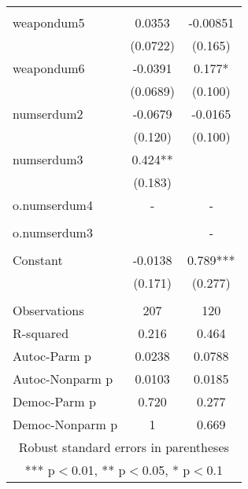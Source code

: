 \documentclass[]{article}
\begin{document}
\begin{tabular}{lcc}
 &  &  \\
weapondum5 & 0.0353 & -0.00851 \\
 & (0.0722) & (0.165) \\
weapondum6 & -0.0391 & 0.177* \\
 & (0.0689) & (0.100) \\
numserdum2 & -0.0679 & -0.0165 \\
 & (0.120) & (0.100) \\
numserdum3 & 0.424** &  \\
 & (0.183) &  \\
o.numserdum4 & - & - \\
 &  &  \\
o.numserdum3 &  & - \\
 &  &  \\
Constant & -0.0138 & 0.789*** \\
 & (0.171) & (0.277) \\
 &  &  \\
Observations & 207 & 120 \\
R-squared & 0.216 & 0.464 \\
Autoc-Parm p & 0.0238 & 0.0788 \\
Autoc-Nonparm p & 0.0103 & 0.0185 \\
Democ-Parm p & 0.720 & 0.277 \\
 Democ-Nonparm p & 1 & 0.669 \\ \hline
\multicolumn{3}{c}{ Robust standard errors in parentheses} \\
\multicolumn{3}{c}{ *** p$<$0.01, ** p$<$0.05, * p$<$0.1} \\
\end{tabular}
\end{document}
